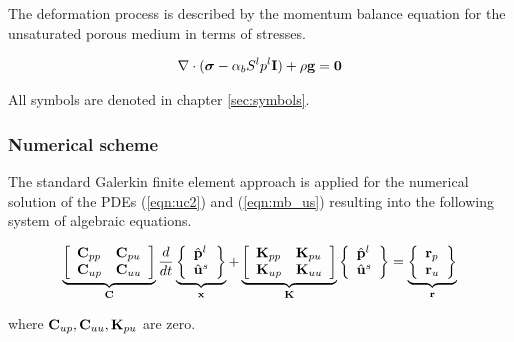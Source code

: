 The deformation process is described by the momentum balance equation for the unsaturated porous medium in terms of stresses.

\begin{eqnarray}
\nabla\cdot
(\bm\sigma - \alpha_b S^l p^l \bf I) + \rho\mathbf g = 0
\label{eqn:mb_us}
\end{eqnarray}

All symbols are denoted in chapter \ref{sec:symbols}.
%

\subsubsection{Numerical scheme}

The standard Galerkin finite element approach is applied for the numerical solution of the PDEs (\ref{eqn:uc2}) and (\ref{eqn:mb_us}) resulting into the following system of algebraic equations.

\begin{eqnarray}
\underbrace{
\left[
\begin{array}{ll}
\mathbf{C}_{pp} & \mathbf{C}_{pu}
\\
\mathbf{C}_{up} & \mathbf{C}_{uu}
\end{array}
\right]
}_{\mathbf C}
%
\frac{d}{dt}
\underbrace{
\left\{
\begin{array}{l}
\hat\PressureVec^l
\\
\hat\Disp^s
\end{array}
\right\}
}_{\mathbf x}
%
+
%
\underbrace{
\left[
\begin{array}{ll}
\mathbf{K}_{pp} & \mathbf{K}_{pu}
\\
\mathbf{K}_{up} & \mathbf{K}_{uu}
\end{array}
\right]
}_{\mathbf K}
%
\left\{
\begin{array}{l}
\hat\PressureVec^l
\\
\hat\Disp^s
\end{array}
\right\}
%
=
\underbrace{
\left\{
\begin{array}{l}
\mathbf{r}_p
\\
\mathbf{r}_u
\end{array}
\right\}
}_{\mathbf{r}}
\nonumber
\\
\end{eqnarray}

where $\mathbf{C}_{up}, \mathbf{C}_{uu}, \mathbf{K}_{pu}$ are zero.

